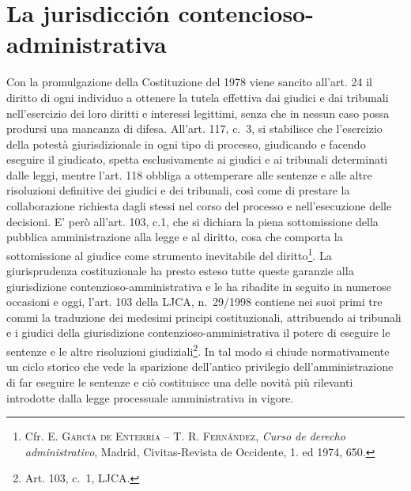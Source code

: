 \documentclass[12pt,it,a4paper,]{report}
\begin{document}
\hypertarget{la-jurisdicciuxf3n-contencioso-administrativa}{%
\section{La jurisdicción
contencioso-administrativa}\label{la-jurisdicciuxf3n-contencioso-administrativa}}

Con la promulgazione della Costituzione del 1978 viene sancito all'art.
24 il diritto di ogni individuo a ottenere la tutela effettiva dai
giudici e dai tribunali nell'esercizio dei loro diritti e interessi
legittimi, senza che in nessun caso possa prodursi una mancanza di
difesa. All'art. 117, c.~3, si stabilisce che l'esercizio della potestà
giurisdizionale in ogni tipo di processo, giudicando e facendo eseguire
il giudicato, spetta esclusivamente ai giudici e ai tribunali
determinati dalle leggi, mentre l'art. 118 obbliga a ottemperare alle
sentenze e alle altre risoluzioni definitive dei giudici e dei
tribunali, così come di prestare la collaborazione richiesta dagli
stessi nel corso del processo e nell'esecuzione delle decisioni. E' però
all'art. 103, c.1, che si dichiara la piena sottomissione della pubblica
amministrazione alla legge e al diritto, cosa che comporta la
sottomissione al giudice come strumento inevitabile del
diritto\footnote{Cfr. E. \textsc{García de Enterría} -- T. R.
  \textsc{Fernández}, \emph{Curso de derecho administrativo}, Madrid,
  Civitas-Revista de Occidente, 1. ed 1974, 650.}. La giurisprudenza
costituzionale ha presto esteso tutte queste garanzie alla giurisdizione
contenzioso-amministrativa e le ha ribadite in seguito in numerose
occasioni e oggi, l'art. 103 della LJCA, n.~29/1998 contiene nei suoi
primi tre commi la traduzione dei medesimi principi costituzionali,
attribuendo ai tribunali e i giudici della giurisdizione
contenzioso-amministrativa il potere di eseguire le sentenze e le altre
risoluzioni giudiziali\footnote{Art. 103, c.~1, LJCA.}. In tal modo si
chiude normativamente un ciclo storico che vede la sparizione
dell'antico privilegio dell'amministrazione di far eseguire le sentenze
e ciò costituisce una delle novità più rilevanti introdotte dalla legge
processuale amministrativa in vigore.
\end{document}
